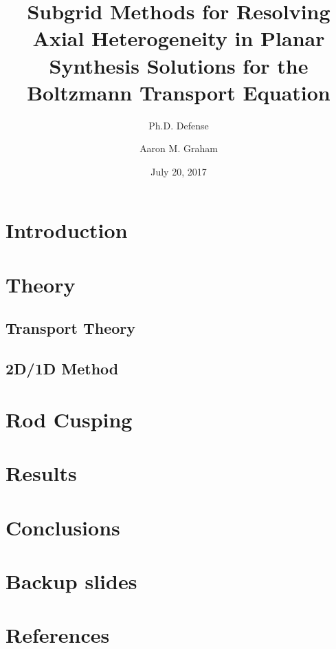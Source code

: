 \documentclass{beamer}
\title[Planar Synthesis Subgrid Methods]{Subgrid Methods for Resolving Axial Heterogeneity in Planar Synthesis Solutions for the Boltzmann Transport Equation}
\subtitle{Ph.D. Defense}
\author{Aaron M. Graham}
\date{July 20, 2017}
\begin{document}
\begin{frame}[t]
    \titlepage
\end{frame}

\begin{frame}[t]
    \tableofcontents[hideallsubsections]
\end{frame}

\section{Introduction}


\section{Theory}
\subsection{Transport Theory}


\subsection{2D/1D Method}


\section{Rod Cusping}



\section{Results}


\section{Conclusions}


\appendix

\section*{Backup slides}


\section*{References}
\renewcommand{\bibname}{References}


\end{document}
